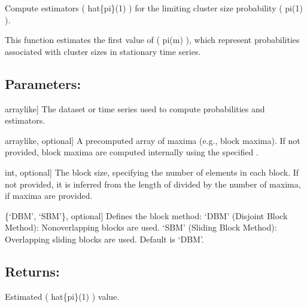 \documentclass[a4paper,11pt,openany,english]{sphinxmanual}
\begin{document}
\begin{fulllineitems}
\label{\detokenize{api_biascorrection:xtremes.biascorrection.hat_pi0}}
\pysigstartsignatures
{}
\pysigstopsignatures
\sphinxAtStartPar
Compute estimators ( hat\{pi\}(1) ) for the limiting cluster size probability ( pi(1) ).

\sphinxAtStartPar
This function estimates the first value of ( pi(m) ), which represent probabilities 
associated with cluster sizes in stationary time series.


\subsection{Parameters:}
\label{\detokenize{api_biascorrection:id8}}\begin{description}
\sphinxlineitem{data}{[}array\sphinxhyphen{}like{]}
\sphinxAtStartPar
The dataset or time series used to compute probabilities and estimators.

\sphinxlineitem{maxima}{[}array\sphinxhyphen{}like, optional{]}
\sphinxAtStartPar
A pre\sphinxhyphen{}computed array of maxima (e.g., block maxima). If not provided, block maxima 
are computed internally using the specified .

\sphinxlineitem{bs}{[}int, optional{]}
\sphinxAtStartPar
The block size, specifying the number of elements in each block. If not provided, it is 
inferred from the length of  divided by the number of maxima, if maxima are provided.

\sphinxlineitem{stride}{[}\{‘DBM’, ‘SBM’\}, optional{]}
\sphinxAtStartPar
Defines the block method:
\sphinxhyphen{} ‘DBM’ (Disjoint Block Method): Non\sphinxhyphen{}overlapping blocks are used.
\sphinxhyphen{} ‘SBM’ (Sliding Block Method): Overlapping sliding blocks are used.
Default is ‘DBM’.

\end{description}


\subsection{Returns:}
\label{\detokenize{api_biascorrection:id9}}\begin{description}
\sphinxAtStartPar
Estimated ( hat\{pi\}(1) ) value.


\end{description}
\end{fulllineitems}
\end{document}
